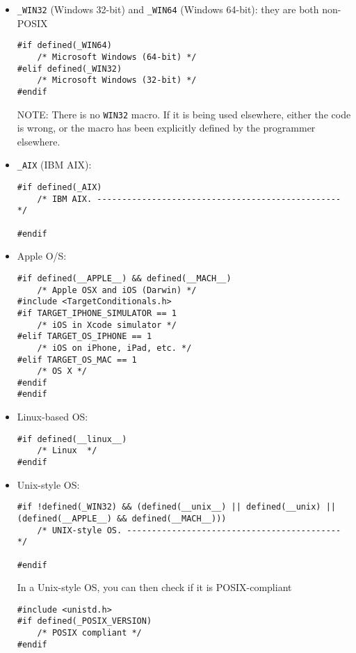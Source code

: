 \begin{itemize}
  \item \verb!_WIN32! (Windows 32-bit) and \verb!_WIN64! (Windows 64-bit): they are both non-POSIX 

\begin{lstlisting}
#if defined(_WIN64)
    /* Microsoft Windows (64-bit) */
#elif defined(_WIN32)
    /* Microsoft Windows (32-bit) */
#endif
\end{lstlisting}
  
  NOTE: There is no \verb!WIN32! macro. If it is being used elsewhere, either the code is wrong, or
  the macro has been explicitly defined by the programmer elsewhere.
  
  \item \verb!_AIX! (IBM AIX):
  
\begin{lstlisting}
#if defined(_AIX)
	/* IBM AIX. ------------------------------------------------- */

#endif
\end{lstlisting}

  \item Apple O/S:
\begin{lstlisting}
#if defined(__APPLE__) && defined(__MACH__)
    /* Apple OSX and iOS (Darwin) */
#include <TargetConditionals.h>
#if TARGET_IPHONE_SIMULATOR == 1
    /* iOS in Xcode simulator */
#elif TARGET_OS_IPHONE == 1
    /* iOS on iPhone, iPad, etc. */    
#elif TARGET_OS_MAC == 1
    /* OS X */
#endif
#endif
\end{lstlisting}

  \item Linux-based OS:
\begin{lstlisting}
#if defined(__linux__)
    /* Linux  */
#endif
\end{lstlisting}

 
  \item Unix-style OS:
\begin{lstlisting}
#if !defined(_WIN32) && (defined(__unix__) || defined(__unix) || (defined(__APPLE__) && defined(__MACH__)))
    /* UNIX-style OS. ------------------------------------------- */

#endif
\end{lstlisting}

In a Unix-style OS, you can then check if it is POSIX-compliant
\begin{lstlisting}
#include <unistd.h>
#if defined(_POSIX_VERSION)
    /* POSIX compliant */
#endif
\end{lstlisting}


\end{itemize}
